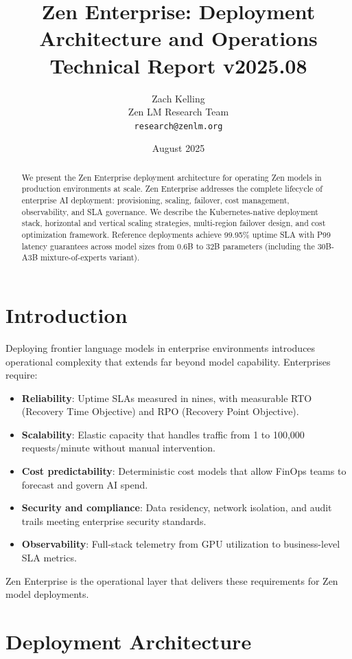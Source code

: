\documentclass[11pt,a4paper]{article}
\title{\textbf{Zen Enterprise: Deployment Architecture and Operations}\\
\large Technical Report v2025.08}
\author{Zach Kelling \\ Zen LM Research Team\\
\texttt{research@zenlm.org}}
\date{August 2025}
\begin{document}
\maketitle

\begin{abstract}
We present the Zen Enterprise deployment architecture for operating Zen models in production environments at scale. Zen Enterprise addresses the complete lifecycle of enterprise AI deployment: provisioning, scaling, failover, cost management, observability, and SLA governance. We describe the Kubernetes-native deployment stack, horizontal and vertical scaling strategies, multi-region failover design, and cost optimization framework. Reference deployments achieve 99.95\% uptime SLA with P99 latency guarantees across model sizes from 0.6B to 32B parameters (including the 30B-A3B mixture-of-experts variant).
\end{abstract}

\section{Introduction}

Deploying frontier language models in enterprise environments introduces operational complexity that extends far beyond model capability. Enterprises require:

\begin{itemize}
  \item \textbf{Reliability}: Uptime SLAs measured in nines, with measurable RTO (Recovery Time Objective) and RPO (Recovery Point Objective).
  \item \textbf{Scalability}: Elastic capacity that handles traffic from 1 to 100,000 requests/minute without manual intervention.
  \item \textbf{Cost predictability}: Deterministic cost models that allow FinOps teams to forecast and govern AI spend.
  \item \textbf{Security and compliance}: Data residency, network isolation, and audit trails meeting enterprise security standards.
  \item \textbf{Observability}: Full-stack telemetry from GPU utilization to business-level SLA metrics.
\end{itemize}

Zen Enterprise is the operational layer that delivers these requirements for Zen model deployments.

\section{Deployment Architecture}
\end{document}
